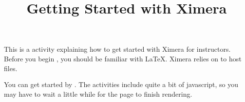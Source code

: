 \documentclass{ximera}
\title{Getting Started with Ximera}
\begin{document}
\maketitle

This is a  activity explaining how to get started with Ximera for instructors. 
Before you begin , you should be familiar with \LaTeX.
Ximera relies on  to host files.





You can get started by . The activities include quite a bit of javascript, so you may have to wait a little while for the page to finish rendering.
\end{document}
